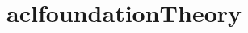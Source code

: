 
\chapter{aclfoundationTheory}
\label{cha:aclFoundationTheory}

\begin{scriptsize}
  
\end{scriptsize}


